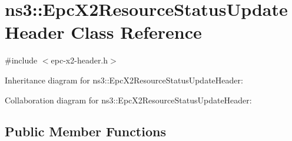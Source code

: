 \hypertarget{classns3_1_1EpcX2ResourceStatusUpdateHeader}{}\section{ns3\+:\+:Epc\+X2\+Resource\+Status\+Update\+Header Class Reference}
\label{classns3_1_1EpcX2ResourceStatusUpdateHeader}


{\ttfamily \#include $<$epc-\/x2-\/header.\+h$>$}



Inheritance diagram for ns3\+:\+:Epc\+X2\+Resource\+Status\+Update\+Header\+:


Collaboration diagram for ns3\+:\+:Epc\+X2\+Resource\+Status\+Update\+Header\+:
\subsection*{Public Member Functions}
